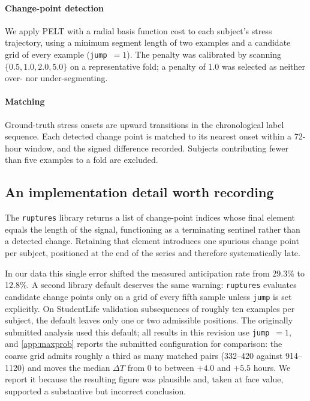 \documentclass[preprint,12pt,authoryear]{elsarticle}
\newcommand{\dt}{$\Delta T$}
\begin{document}
\paragraph{Change-point detection} We apply PELT \citep{killick2012}
with a radial basis function cost to each subject's stress
trajectory, using a minimum segment length of two examples and a
candidate grid of every example (\texttt{jump}~$=1$). The penalty was calibrated by scanning
$\{0.5, 1.0, 2.0, 5.0\}$ on a representative fold; a penalty of 1.0
was selected as neither over- nor under-segmenting.

\paragraph{Matching} Ground-truth stress onsets are upward transitions
in the chronological label sequence. Each detected change point is
matched to its nearest onset within a 72-hour window, and the signed difference recorded. Subjects contributing fewer than five examples to
a fold are excluded.

\subsection{An implementation detail worth recording}

The \texttt{ruptures} library \citep{truong2020} returns a list of
change-point indices whose final element equals the length of the
signal, functioning as a terminating sentinel rather than a detected
change. Retaining that element introduces one spurious change point per
subject, positioned at the end of the series and therefore
systematically late.

In our data this single error shifted the measured anticipation rate
from 29.3\% to 12.8\%. A second library default deserves the same
warning: \texttt{ruptures} evaluates candidate change points only on a
grid of every fifth sample unless \texttt{jump} is set explicitly. On
StudentLife validation subsequences of roughly ten examples per
subject, the default leaves only one or two admissible positions. The
originally submitted analysis used this default; all results in this
revision use \texttt{jump}~$=1$, and \ref{app:maxprob}
reports the submitted configuration for comparison: the coarse grid
admits roughly a third as many matched pairs (332--420 against
914--1120) and moves the median \dt{} from 0 to between $+4.0$ and
$+5.5$ hours. We report it because the resulting figure was
plausible and, taken at face value, supported a substantive but
incorrect conclusion.
\end{document}
